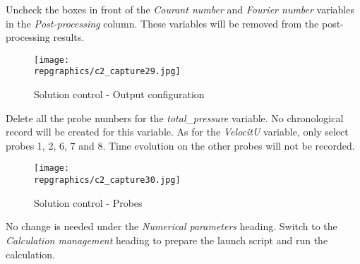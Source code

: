 Uncheck the boxes in front of the {\itshape Courant number} and {\itshape
Fourier number} variables in the {\itshape Post-processing} column. These
variables will be removed from the post-processing results.

\begin{figure}[h!]
\begin{center}
\texttt{[image: \\repgraphics/c2\_capture29.jpg]}
\caption{Solution control - Output configuration}
\label{fig29_e2}
\end{center}
\end{figure}


\newpage
Delete all the probe numbers for the {\itshape total\_pressure} variable. No
chronological record will be created for this variable. As for the
{\itshape VelocitU} variable, only select probes  1, 2, 6, 7 and 8. Time
evolution on the other probes will not be recorded.

\begin{figure}[h!]
\begin{center}
\texttt{[image: \\repgraphics/c2\_capture30.jpg]}
\caption{Solution control - Probes}
\label{fig30_e2}
\end{center}
\end{figure}


No change is needed under the {\itshape Numerical parameters} heading.
Switch to the {\itshape Calculation management} heading to prepare the launch
script and run the calculation.

